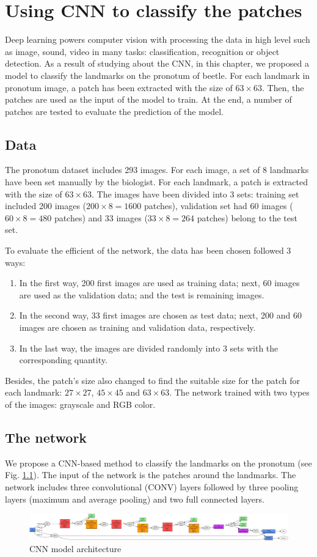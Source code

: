 \chapter{Using CNN to classify the patches}
Deep learning powers computer vision with processing the data in high level such as image, sound, video in many tasks: classification, recognition or object detection. 
As a result of studying about the CNN, in this chapter, we proposed a model to classify
the landmarks on the pronotum of beetle. For each landmark in pronotum image, a patch
has been extracted with the size of $63\times63$. Then, the patches are used as the input of the model to train. At the end, a number of patches are tested to evaluate
the prediction of the model.

\section{Data}
The pronotum dataset includes 293 images. For each image, a set of 8 landmarks have been set manually by the biologist. For each landmark, a patch is extracted with the size of $63\times63$.
The images have been divided into 3 sets: training set included 200 images ($200 \times 8 = 1600 $ patches), validation set had 60 images ($60 \times 8 = 480$ patches) and 33 images ($33 \times 8 = 264$ patches) belong to the test set.

To evaluate the efficient of the network, the data has been chosen followed 3 ways: 
\begin{enumerate}
	\item In the first way, 200 first images are used as training data; next, 60 images are used as the validation data; and the test is remaining images.
	\item In the second way, 33 first images are chosen as test data; next, 200 and 60 images are chosen as training and validation data, respectively.
	\item In the last way, the images are divided randomly into 3 sets with the corresponding quantity.
\end{enumerate}

Besides, the patch's size also changed to find the suitable size for the patch for each landmark: $27 \times 27$, $45 \times 45$ and $63 \times 63$. The network trained with two types of the images: grayscale and RGB color.
\section{The network}
We propose a CNN-based method to classify the landmarks on the pronotum (see Fig. \ref{figCNNclassify}). The input of the network is the patches around the landmarks. The network includes three convolutional (CONV) layers followed by three pooling layers (maximum and average pooling) and two full connected layers. 
\begin{figure}[h]
	\centering
	\includegraphics[scale=0.2]{images/CNN_classify}
	\caption{CNN model architecture}
	\label{figCNNclassify}
\end{figure}

